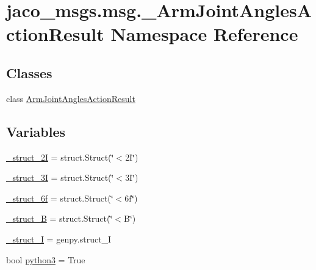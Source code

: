 \hypertarget{namespacejaco__msgs_1_1msg_1_1__ArmJointAnglesActionResult}{}\section{jaco\+\_\+msgs.\+msg.\+\_\+\+Arm\+Joint\+Angles\+Action\+Result Namespace Reference}
\label{namespacejaco__msgs_1_1msg_1_1__ArmJointAnglesActionResult}
\subsection*{Classes}
\begin{DoxyCompactItemize}
\item 
class \hyperlink{classjaco__msgs_1_1msg_1_1__ArmJointAnglesActionResult_1_1ArmJointAnglesActionResult}{Arm\+Joint\+Angles\+Action\+Result}
\end{DoxyCompactItemize}
\subsection*{Variables}
\begin{DoxyCompactItemize}
\item 
\hyperlink{namespacejaco__msgs_1_1msg_1_1__ArmJointAnglesActionResult_a14e79f2018047655b3fb9be2876365f7}{\+\_\+struct\+\_\+2I} = struct.\+Struct(\char`\"{}$<$2\+I\char`\"{})
\item 
\hyperlink{namespacejaco__msgs_1_1msg_1_1__ArmJointAnglesActionResult_a39a10833e7229eb70256efaf198c5ffb}{\+\_\+struct\+\_\+3I} = struct.\+Struct(\char`\"{}$<$3\+I\char`\"{})
\item 
\hyperlink{namespacejaco__msgs_1_1msg_1_1__ArmJointAnglesActionResult_a0691c4ccd5c3dabd070c57b499b150fc}{\+\_\+struct\+\_\+6f} = struct.\+Struct(\char`\"{}$<$6f\char`\"{})
\item 
\hyperlink{namespacejaco__msgs_1_1msg_1_1__ArmJointAnglesActionResult_a8475a8042c705373b285390c15327355}{\+\_\+struct\+\_\+B} = struct.\+Struct(\char`\"{}$<$B\char`\"{})
\item 
\hyperlink{namespacejaco__msgs_1_1msg_1_1__ArmJointAnglesActionResult_ae8a5ceb6f5bb3ca34bee3120fae16ea5}{\+\_\+struct\+\_\+I} = genpy.\+struct\+\_\+I
\item 
bool \hyperlink{namespacejaco__msgs_1_1msg_1_1__ArmJointAnglesActionResult_ab284ada115eb325ebae51be3853f1d59}{python3} = True
\end{DoxyCompactItemize}


